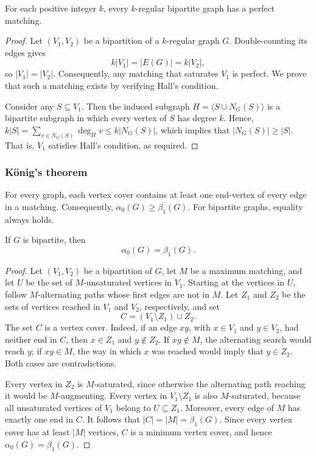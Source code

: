 \begin{Corollary}\label{cor:k-regBipartitePM}
For each positive integer $k$, every $k$-regular bipartite graph has a perfect matching.
\end{Corollary}

\begin{proof}
Let $(V_1,V_2)$ be a bipartition of a $k$-regular graph $G$. Double-counting its edges gives
\begin{equation*}
k|V_1|=|E(G)|=k|V_2|,
\end{equation*}
so $|V_1|=|V_2|$. Consequently, any matching that saturates $V_1$ is perfect. We prove that such a matching exists by verifying Hall's condition.

Consider any $S \subseteq V_1$. Then the induced subgraph $H = \langle S \cup N_G(S) \rangle$ is a bipartite subgraph in which every vertex of $S$ has degree $k$. Hence, $k|S| = \sum_{v \in N_G(S)} \deg_H v \le k|N_G(S)|$, which implies that $|N_G(S)| \ge |S|$. That is, $V_1$ satisfies Hall's condition, as required.
\end{proof}

\subsubsection{K\"onig's theorem}

For every graph, each vertex cover contains at least one end-vertex of every edge in a matching. Consequently, $\alpha_0(G)\ge\beta_1(G)$. For bipartite graphs, equality always holds.

\begin{Theorem}[K\"onig]\label{thm:Konig}
If $G$ is bipartite, then
\begin{equation*}
\alpha_0(G)=\beta_1(G).
\end{equation*}
\end{Theorem}

\begin{proof}
Let $(V_1,V_2)$ be a bipartition of $G$, let $M$ be a maximum matching, and let $U$ be the set of $M$-unsaturated vertices in $V_1$. Starting at the vertices in $U$, follow $M$-alternating paths whose first edges are not in $M$. Let $Z_1$ and $Z_2$ be the sets of vertices reached in $V_1$ and $V_2$, respectively, and set
\begin{equation*}
C=(V_1\setminus Z_1)\cup Z_2.
\end{equation*}
The set $C$ is a vertex cover. Indeed, if an edge $xy$, with $x\in V_1$ and $y\in V_2$, had neither end in $C$, then $x\in Z_1$ and $y\notin Z_2$. If $xy\notin M$, the alternating search would reach $y$; if $xy\in M$, the way in which $x$ was reached would imply that $y\in Z_2$. Both cases are contradictions.

Every vertex in $Z_2$ is $M$-saturated, since otherwise the alternating path reaching it would be $M$-augmenting. Every vertex in $V_1\setminus Z_1$ is also $M$-saturated, because all unsaturated vertices of $V_1$ belong to $U\subseteq Z_1$. Moreover, every edge of $M$ has exactly one end in $C$. It follows that $|C|=|M|=\beta_1(G)$. Since every vertex cover has at least $|M|$ vertices, $C$ is a minimum vertex cover, and hence $\alpha_0(G)=\beta_1(G)$.
\end{proof}

